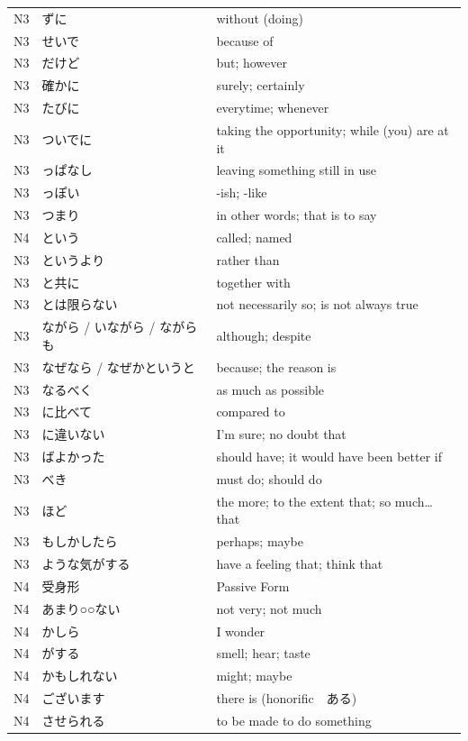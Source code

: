 \begin{longtable}{p{2cm} p{4cm} p{8cm}}
N3	&   ずに  &   	without (doing) \\
N3	&   せいで &   	because of  \\
N3	&   だけど &   	but; however\\
N3	&   確かに &	    surely; certainly\\
N3	&   たびに &   	everytime; whenever\\
N3	&   ついでに   &	taking the opportunity; while (you) are at it\\
N3	&   っぱなし  &	    leaving something still in use\\
N3	&   っぽい &   	    -ish; -like \\
N3	&   つまり &   	    in other words; that is to say\\
N4	&   という &   	    called; named\\
N3	&   というより  &    rather than\\
N3	&   と共に &   	    together with\\
N3	&   とは限らない &	not necessarily so; is not always true\\
N3	&   ながら / いながら / ながらも	&   although; despite \\
N3	&   なぜなら / なぜかというと  &	because; the reason is\\
N3	&   なるべく    &	as much as possible\\
N3	&   に比べて	&       compared to\\
N3	&   に違いない   &	I'm sure; no doubt that\\
N3	&   ばよかった   &	should have; it would have been better if\\
N3	&   べき       &   	must do; should do\\
N3	&   ほど	    &       the more; to the extent that; so much… that\\
N3	&   もしかしたら  &	perhaps; maybe\\
N3	&   ような気がする &	have a feeling that; think that\\
N4	&   受身形 &        Passive Form\\
N4	&   あまり○○ない &	not very; not much\\
N4	&   かしら &       	I wonder\\
N4	&   がする &       	smell; hear; taste\\
N4	&   かもしれない  &	might; maybe\\
N4	&   ございます   &	there is (honorific　ある)\\
N4	&   させられる   &	to be made to do something\\

\end{longtable}

